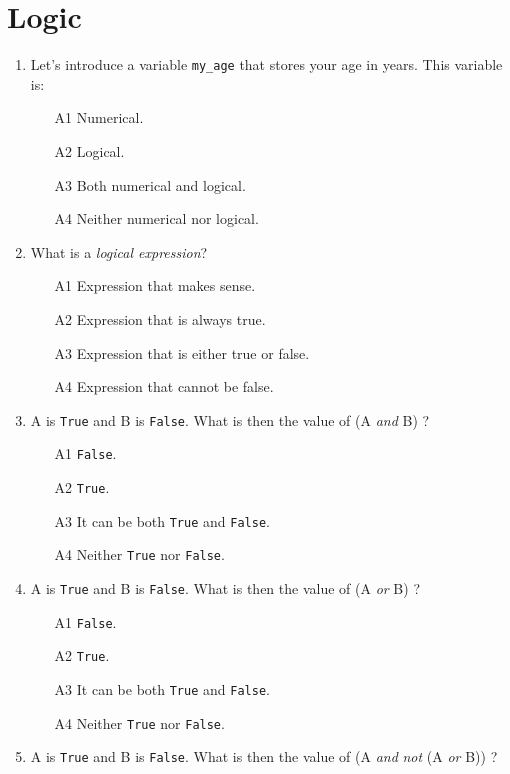 
\section{Logic}

\begin{enumerate}
\item Let's introduce a variable {\tt my\_age} that stores your age in years.
      This variable is:
\begin{enumerate}
\item[A1] Numerical.
\item[A2] Logical.
\item[A3] Both numerical and logical.
\item[A4] Neither numerical nor logical.
\end{enumerate}
\item What is a {\em logical expression}? 
\begin{enumerate}
\item[A1] Expression that makes sense.
\item[A2] Expression that is always true. 
\item[A3] Expression that is either true or false.
\item[A4] Expression that cannot be false.
\end{enumerate}
\item A is {\tt True} and B is {\tt False}. What is then the value of (A {\em and} B) ?
\begin{enumerate}
\item[A1] {\tt False}.
\item[A2] {\tt True}.
\item[A3] It can be both {\tt True} and {\tt False}.
\item[A4] Neither {\tt True} nor {\tt False}.
\end{enumerate}
\item A is {\tt True} and B is {\tt False}. What is then the value of (A {\em or} B) ?
\begin{enumerate}
\item[A1] {\tt False}.
\item[A2] {\tt True}.
\item[A3] It can be both {\tt True} and {\tt False}.
\item[A4] Neither {\tt True} nor {\tt False}.
\end{enumerate}
\item A is {\tt True} and B is {\tt False}. What is then the value of (A {\em and} {\em not} (A {\em or} B)) ?

\end{enumerate}
